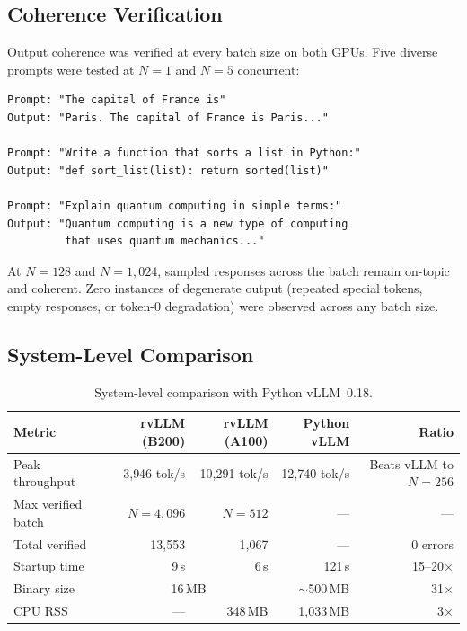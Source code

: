 \documentclass[11pt,a4paper]{article}
\newcommand{\thead}[1]{\textbf{#1}}
\begin{document}
\subsection{Coherence Verification}

Output coherence was verified at every batch size on both GPUs. Five diverse
prompts were tested at $N\!=\!1$ and $N\!=\!5$ concurrent:

\begin{lstlisting}[language={},numbers=none,frame=none,xleftmargin=0em]
Prompt: "The capital of France is"
Output: "Paris. The capital of France is Paris..."

Prompt: "Write a function that sorts a list in Python:"
Output: "def sort_list(list): return sorted(list)"

Prompt: "Explain quantum computing in simple terms:"
Output: "Quantum computing is a new type of computing
         that uses quantum mechanics..."
\end{lstlisting}

At $N\!=\!128$ and $N\!=\!1{,}024$, sampled responses across the batch remain
on-topic and coherent. Zero instances of degenerate output (repeated special tokens,
empty responses, or token-0 degradation) were observed across any batch size.

\subsection{System-Level Comparison}

\begin{table}[t]
  \centering
  \caption{System-level comparison with Python vLLM~0.18.}
  \label{tab:system}
  \small
  \begin{tabular}{@{}lrrrr@{}}
    \toprule
    \rowcolor{HeaderBlue} \thead{Metric} & \thead{rvLLM (B200)} & \thead{rvLLM (A100)} & \thead{Python vLLM} & \thead{Ratio} \\
    \midrule
    Peak throughput    & 3{,}946 tok/s & 10{,}291 tok/s & 12{,}740 tok/s & Beats vLLM to $N\!=\!256$ \\
    \rowcolor{gray!8}
    Max verified batch & $N\!=\!4{,}096$ & $N\!=\!512$ & --- & --- \\
    Total verified     & 13{,}553 & 1{,}067 & --- & 0 errors \\
    \rowcolor{gray!8}
    Startup time       & 9\,s    & 6\,s    & 121\,s  & 15--20$\times$ \\
    Binary size        & \multicolumn{2}{c}{16\,MB} & $\sim$500\,MB & 31$\times$ \\
    \rowcolor{gray!8}
    CPU RSS            & ---     & 348\,MB & 1{,}033\,MB & 3$\times$ \\
    \bottomrule
  \end{tabular}
\end{table}
\end{document}
